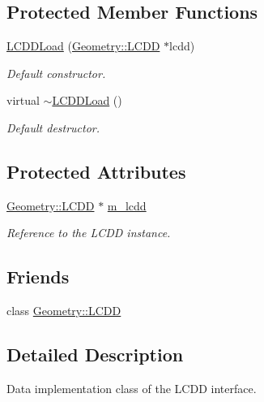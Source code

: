\subsection*{Protected Member Functions}
\begin{DoxyCompactItemize}
\item 
\hyperlink{class_d_d4hep_1_1_l_c_d_d_load_a684443cb47baee03eb18960afe55458a}{L\+C\+D\+D\+Load} (\hyperlink{class_d_d4hep_1_1_geometry_1_1_l_c_d_d}{Geometry\+::\+L\+C\+DD} $\ast$lcdd)
\begin{DoxyCompactList}\small\item\em Default constructor. \end{DoxyCompactList}\item 
virtual \hyperlink{class_d_d4hep_1_1_l_c_d_d_load_a8eef72df9f1cf96011f88c000690f326}{$\sim$\+L\+C\+D\+D\+Load} ()
\begin{DoxyCompactList}\small\item\em Default destructor. \end{DoxyCompactList}\end{DoxyCompactItemize}
\subsection*{Protected Attributes}
\begin{DoxyCompactItemize}
\item 
\hyperlink{class_d_d4hep_1_1_geometry_1_1_l_c_d_d}{Geometry\+::\+L\+C\+DD} $\ast$ \hyperlink{class_d_d4hep_1_1_l_c_d_d_load_a6420b6f11b8ee02144ef00bbeda63737}{m\+\_\+lcdd}
\begin{DoxyCompactList}\small\item\em Reference to the L\+C\+DD instance. \end{DoxyCompactList}\end{DoxyCompactItemize}
\subsection*{Friends}
\begin{DoxyCompactItemize}
\item 
class \hyperlink{class_d_d4hep_1_1_l_c_d_d_load_a6ad008feefc2e21d2190b244a0c96961}{Geometry\+::\+L\+C\+DD}
\end{DoxyCompactItemize}


\subsection{Detailed Description}
Data implementation class of the L\+C\+DD interface. 

